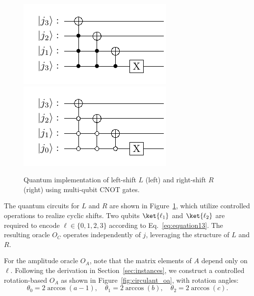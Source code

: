 \documentclass{article}
\begin{document}
\begin{figure}[htbp]
  \centering
  \includegraphics{pdf/circulant_l_shift} \quad
  \includegraphics{pdf/circulant_r_shift}
  \caption{Quantum implementation of left-shift $L$ (left) and right-shift $R$ (right) using multi-qubit CNOT gates.}
  \label{fig:circulant_lr}
\end{figure}

The quantum circuits for $L$ and $R$ are shown in Figure~\ref{fig:circulant_lr}, which utilize controlled operations to realize cyclic shifts. Two qubits $\ket{\ell_1}$ and $\ket{\ell_2}$ are required to encode $\ell \in \{0,1,2,3\}$ according to Eq.~\eqref{eq:equation13}. The resulting oracle $O_C$ operates independently of $j$, leveraging the structure of $L$ and $R$.

For the amplitude oracle $O_A$, note that the matrix elements of $A$ depend only on $\ell$. Following the derivation in Section~\ref{sec:instances}, we construct a controlled rotation-based $O_A$ as shown in Figure~\ref{fig:circulant_oa}, with rotation angles:
$$
\theta_0 = 2\arccos(a-1), \quad
\theta_1 = 2\arccos(b), \quad
\theta_2 = 2\arccos(c).
$$
\end{document}
